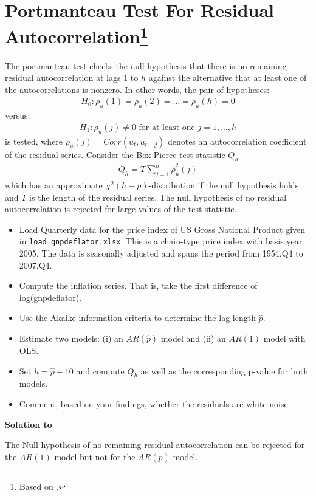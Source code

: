 \documentclass[a4paper]{scrartcl}
\begin{document}
\section[Portmanteau Test For Residual Autocorrelation]{Portmanteau Test For Residual Autocorrelation\footnote{Based on \citet{Luetkepohl.2004}.}}\label{ex:Portmanteau}
The portmanteau test checks the null hypothesis that there is no remaining residual autocorrelation at lags $1$ to $h$ against the alternative that at least one of the autocorrelations is nonzero. In other words, the pair of hypotheses:
\begin{align*}
H_0:\rho_u(1)=\rho_u(2)=...=\rho_u(h) = 0
\end{align*}
versus:
\begin{align*}
H_1:\rho_u(j)\neq 0 \text{ for at least one }j=1,...,h
\end{align*}
is tested, where $\rho_u(j) = Corr(u_t, u_{t-j})$ denotes an autocorrelation coefficient of
the residual series. Consider the Box-Pierce test statistic $Q_h$
\begin{align*}
Q_h = T \sum_{j=1}^h \hat{\rho}^2_u(j)
\end{align*}
which has an approximate $\chi^2(h-p)$-distribution if the null hypothesis holds and $T$ is the length of the residual series. The null hypothesis of no residual autocorrelation is rejected for large values of the test statistic. 

\begin{itemize}
	\item Load Quarterly data for the price index of US Gross National Product given in \texttt{load gnpdeflator.xlsx}. This is a chain-type price index with basis year 2005. The data is seasonally adjusted and spans the period from 1954.Q4 to 2007.Q4.
	\item Compute the inflation series. That is, take the first difference of log(gnpdeflator).
	\item Use the Akaike information criteria to determine the lag length $\hat{p}$.
	\item Estimate two models: (i) an $AR(\hat{p})$ model and (ii) an $AR(1)$ model with OLS.
	\item Set $h=\hat{p}+10$ and compute $Q_h$ as well as the corresponding p-value for both models.
	\item Comment, based on your findings, whether the residuals are white noise.
\end{itemize}
\begin{solution}\textbf{Solution to }

The Null hypothesis of no remaining residual autocorrelation can be rejected for the $AR(1)$ model but not for the $AR(\hat{p})$ model.
\newpage %
\end{solution}
\end{document}
